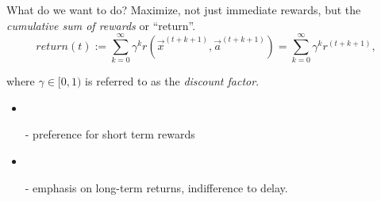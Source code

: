 \begin{frame}\frametitle{\secname}

\begin{block}{What do we want to do?}
Maximize, not just immediate rewards, but the \emph{cumulative sum of rewards} or ``return''.
\slidesonly{\vspace{-3mm}}
\begin{equation}
\mathit{return}(t) := \sum_{k=0}^{\infty} \gamma^k r(\vec x^{(t+k+1)}, \vec a^{(t+k+1)}) = \sum_{k=0}^{\infty} \gamma^k r^{(t+k+1)},
\end{equation}

where $\gamma \in \lbrack0,1)$ is referred to as the \emph{discount factor}.
 
\end{block}


\begin{itemize}

\pause

\item {}\\

\pause

\pause

- preference for short term rewards

\pause

\item {}\\

\pause

- emphasis on long-term returns, indifference to delay.

\end{itemize}

\end{frame}

